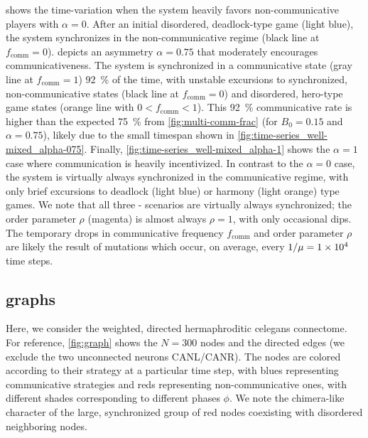 \documentclass[pdflatex,lineno,referee,sn-nature]{sn-jnl}
\begin{document}
 shows the time-variation
when the system heavily favors non-communicative players
with $\alpha = 0$.
After an initial disordered, deadlock-type game (light blue),
the system synchronizes in the non-communicative regime
(black line at $f_{\text{comm}} = 0$).
 depicts an asymmetry $\alpha = 0.75$
that moderately encourages communicativeness.
The system is synchronized in a communicative state
(gray line at $f_{\text{comm}} = 1$) \SI{92}{\percent} of the time,
with unstable excursions to synchronized, non-communicative states
(black line at $f_{\text{comm}} = 0$)
and disordered, hero-type game states
(orange line with $0 < f_{\text{comm}} < 1$).
This \SI{92}{\percent} communicative rate is higher than the expected \SI{75}{\percent}
from \cref{fig:multi-comm-frac} (for $B_0 = 0.15$ and $\alpha = 0.75$),
likely due to the small timespan shown in
\cref{fig:time-series_well-mixed_alpha-075}.
Finally, \cref{fig:time-series_well-mixed_alpha-1} shows the
$\alpha = 1$ case where communication is heavily incentivized.
In contrast to the  $\alpha = 0$ case,
the system is virtually always synchronized in the communicative regime,
with only brief excursions to deadlock (light blue)
or harmony (light orange) type games.
We note that all three
-
scenarios are virtually always synchronized;
the order parameter $\rho$ (magenta) is almost always $\rho = 1$,
with only occasional dips.
The temporary drops in communicative frequency $f_{\text{comm}}$
and order parameter $\rho$ are likely the result of mutations
which occur, on average, every $1/\mu = \num{1E4}$ time steps.

\subsection{ graphs}\label{sec:elegans_graph}

Here, we consider the weighted, directed hermaphroditic \gls{celegans} connectome.
For reference, \cref{fig:graph} shows the $N = 300$ nodes and the directed edges
(we exclude the two unconnected neurons CANL/CANR).
The nodes are colored according to their strategy at a particular time step,
with blues representing communicative strategies
and reds representing non-communicative ones,
with different shades corresponding to different phases $\phi$.
We note the chimera-like character
of the large, synchronized group of red nodes
coexisting with disordered neighboring nodes.
\end{document}
